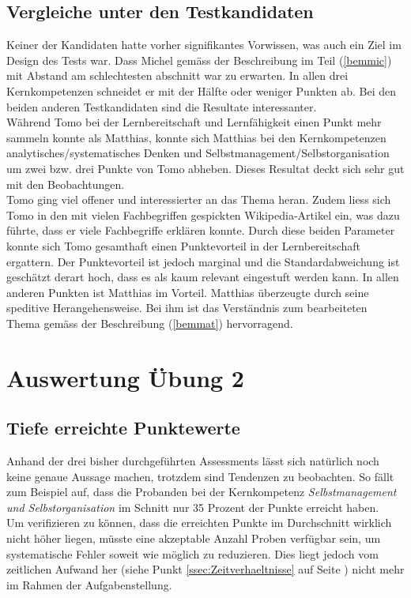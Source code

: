 \subsection{Vergleiche unter den Testkandidaten}
Keiner der Kandidaten hatte vorher signifikantes Vorwissen, was auch ein Ziel im Design des Tests war.
Dass Michel gemäss der Beschreibung im Teil (\ref{bemmic}) mit Abstand am schlechtesten abschnitt war zu erwarten. In allen drei Kernkompetenzen schneidet er mit der Hälfte oder weniger Punkten ab. Bei den beiden anderen Testkandidaten sind die Resultate interessanter. \\
Während Tomo bei der Lernbereitschaft und Lernfähigkeit einen Punkt mehr sammeln konnte als Matthias, konnte sich Matthias bei den Kernkompetenzen analytisches/systematisches Denken und Selbstmanagement/Selbstorganisation um zwei bzw. drei Punkte von Tomo abheben. Dieses Resultat deckt sich sehr gut mit den Beobachtungen. \\
Tomo ging viel offener und interessierter an das Thema heran. Zudem liess sich Tomo in den mit vielen Fachbegriffen gespickten Wikipedia-Artikel ein, was dazu führte, dass er viele Fachbegriffe erklären konnte. Durch diese beiden Parameter konnte sich Tomo gesamthaft einen Punktevorteil in der Lernbereitschaft ergattern. Der Punktevorteil ist jedoch marginal und die Standardabweichung ist geschätzt derart hoch, dass es als kaum relevant eingestuft werden kann. In allen anderen Punkten ist Matthias im Vorteil. Matthias überzeugte durch seine speditive Herangehensweise. Bei ihm ist das Verständnis zum bearbeiteten Thema gemäss der Beschreibung (\ref{bemmat}) hervorragend. 

\section{Auswertung Übung 2}

\subsection{Tiefe erreichte Punktewerte}

Anhand der drei bisher durchgeführten Assessments lässt sich natürlich noch keine genaue Aussage machen, trotzdem sind Tendenzen zu beobachten. So fällt zum Beispiel auf, dass die Probanden bei der Kernkompetenz \textit{Selbstmanagement und Selbstorganisation} im Schnitt nur 35 Prozent der Punkte erreicht haben.\\
Um verifizieren zu können, dass die erreichten Punkte im Durchschnitt wirklich nicht höher liegen, müsste eine akzeptable Anzahl Proben verfügbar sein, um systematische Fehler soweit wie möglich zu reduzieren. Dies liegt jedoch vom zeitlichen Aufwand her (siehe Punkt \ref{ssec:Zeitverhaeltnisse} auf Seite \pageref{ssec:Zeitverhaeltnisse}) nicht mehr im Rahmen der Aufgabenstellung.
